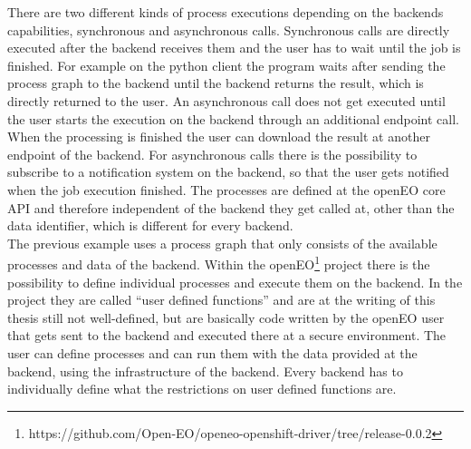 \documentclass[draft,final]{vutinfth} %
\begin{document}
There are two different kinds of process executions depending on the backends capabilities, synchronous and asynchronous calls. Synchronous calls are directly executed after the backend receives them and the user has to wait until the job is finished. For example on the python client the program waits after sending the process graph to the backend until the backend returns the result, which is directly returned to the user. An asynchronous call does not get executed until the user starts the execution on the backend through an additional endpoint call. When the processing is finished the user can download the result at another endpoint of the backend. For asynchronous calls there is the possibility to subscribe to a notification system on the backend, so that the user gets notified when the job execution finished.     
The processes are defined at the openEO core API and therefore independent of the backend they get called at, other than the data identifier, which is different for every backend.  
\\
The previous example uses a process graph that only consists of the available processes and data of the backend. Within the openEO\footnote{https://github.com/Open-EO/openeo-openshift-driver/tree/release-0.0.2} project there is the possibility to define individual processes and execute them on the backend. In the project they are called “user defined functions” and are at the writing of this thesis still not well-defined, but are basically code written by the openEO user that gets sent to the backend and executed there at a secure environment. The user can define processes and can run them with the data provided at the backend, using the infrastructure of the backend. Every backend has to individually define what the restrictions on user defined functions are. 
\end{document}
